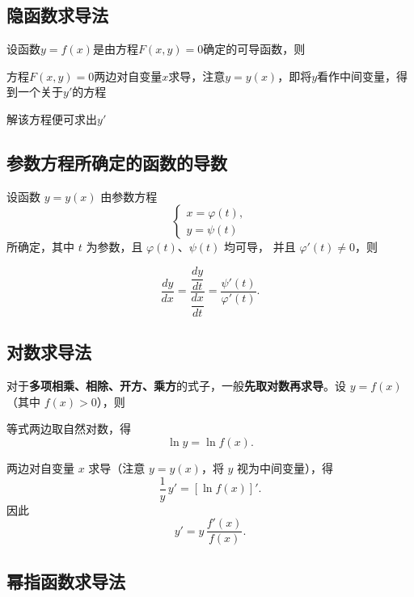 \documentclass[../book.tex]{subfiles}
\begin{document}
    \subsection{隐函数求导法}

    设函数$y = f(x)$是由方程$F(x, y) = 0$确定的可导函数，则
    \begin{circlenum}
        \item 方程$F(x, y) = 0$两边对自变量$x$求导，注意$y = y(x)$，即将$y$看作中间变量，得到一个关于$y'$的方程
        \item 解该方程便可求出$y'$
    \end{circlenum}

    \subsection{参数方程所确定的函数的导数}

    设函数 $y=y(x)$ 由参数方程
    \[
        \begin{cases}
            x=\varphi(t),\\
            y=\psi(t)
        \end{cases}
    \]
    所确定，其中 $t$ 为参数，且 $\varphi(t)$、$\psi(t)$ 均可导，
    并且 $\varphi'(t)\neq 0$，则

    \[
        \frac{dy}{dx}
        =
        \frac{\dfrac{dy}{dt}}{\dfrac{dx}{dt}}
        =
        \frac{\psi'(t)}{\varphi'(t)}.
    \]

    \subsection{对数求导法}

    对于\textbf{多项相乘、相除、开方、乘方}的式子，一般\textbf{先取对数再求导}。设 $y=f(x)$（其中 $f(x)>0$），则
    \begin{circlenum}
        \item 等式两边取自然对数，得
        \[
            \ln y = \ln f(x).
        \]

        \item 两边对自变量 $x$ 求导（注意 $y=y(x)$，将 $y$ 视为中间变量），得
        \[
            \frac{1}{y}\,y' = [\ln f(x)]'.
        \]
        因此
        \[
            y' = y\,\frac{f'(x)}{f(x)}.
        \]
    \end{circlenum}

    \subsection{幂指函数求导法}
\end{document}
